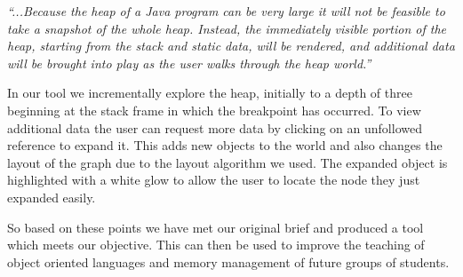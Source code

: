 \documentclass[11pt, a4paper]{report}
\begin{document}
\emph{``...Because the heap of a Java program can be very large it will not be feasible to take a snapshot of the whole heap. Instead, the immediately visible portion of the heap, starting from the stack and static data, will be rendered, and additional data will be brought into play as the user walks through the heap world.''}

In our tool we incrementally explore the heap, initially to a depth of three beginning at the stack frame in which the breakpoint has occurred. To view additional data the user can request more data by clicking on an unfollowed reference to expand it. This adds new objects to the world and also changes the layout of the graph due to the layout algorithm we used. The expanded object is highlighted with a white glow to allow the user to locate the node they just expanded easily.

So based on these points we have met our original brief and produced a tool which meets our objective. This can then be used to improve the teaching of object oriented languages and memory management of future groups of students. 
\end{document}
